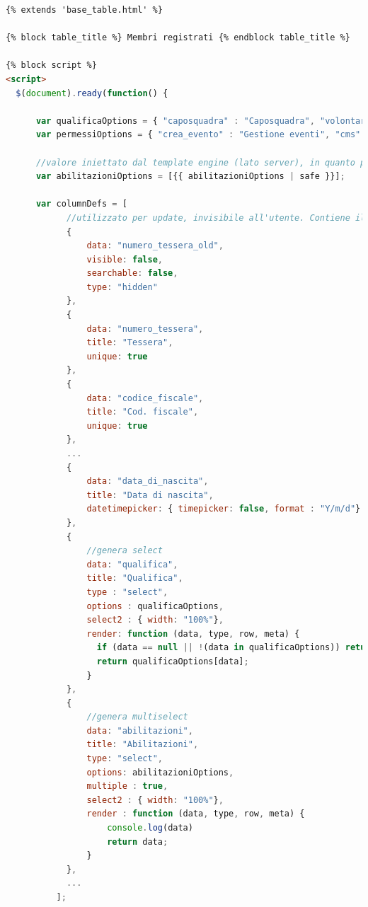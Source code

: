 \documentclass[11pt,a4paper,english]{article}
\begin{document}
\begin{lstlisting}[language=html, caption=Esempio template - persona.html]
{% extends 'base_table.html' %} 

{% block table_title %} Membri registrati {% endblock table_title %} 

{% block script %}
<script>
  $(document).ready(function() {

      var qualificaOptions = { "caposquadra" : "Caposquadra", "volontario" : "Volontario" , "coordinatore" : "Coordinatore" };
      var permessiOptions = { "crea_evento" : "Gestione eventi", "cms" : "Gestione piattaforma" };
      
      //valore iniettato dal template engine (lato server), in quanto presi dal database
      var abilitazioniOptions = [{{ abilitazioniOptions | safe }}];

      var columnDefs = [
            //utilizzato per update, invisibile all'utente. Contiene il valore di "numero_tessera" prima della modifica.
            {
                data: "numero_tessera_old",
                visible: false,
                searchable: false,
                type: "hidden"
            },
            {
                data: "numero_tessera",
                title: "Tessera",
                unique: true
            },
            {
                data: "codice_fiscale",
                title: "Cod. fiscale",
                unique: true
            },
            ...
            {
                data: "data_di_nascita",
                title: "Data di nascita",
                datetimepicker: { timepicker: false, format : "Y/m/d"}
            },
            {
                //genera select
                data: "qualifica",
                title: "Qualifica",
                type : "select",
                options : qualificaOptions,
                select2 : { width: "100%"},
                render: function (data, type, row, meta) {
                  if (data == null || !(data in qualificaOptions)) return null;
                  return qualificaOptions[data];
                }
            },
            {
                //genera multiselect
                data: "abilitazioni",
                title: "Abilitazioni",
                type: "select",
                options: abilitazioniOptions,
                multiple : true,
                select2 : { width: "100%"},
                render : function (data, type, row, meta) {
                    console.log(data)
                    return data;
                }
            },
            ...
          ];



\end{lstlisting}
\end{document}
